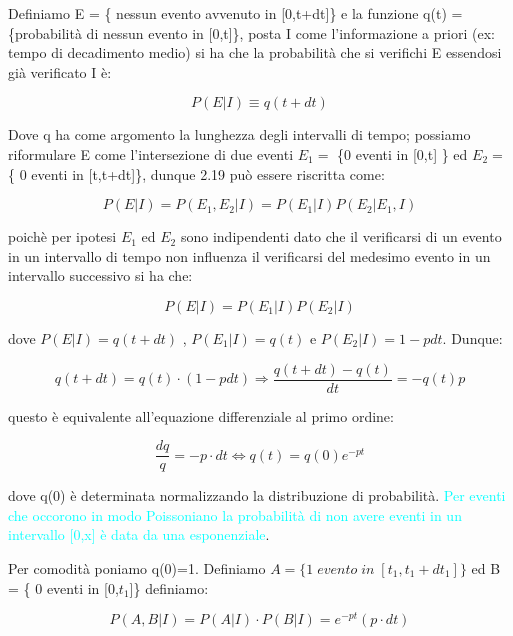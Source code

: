 \documentclass[11pt,a4paper]{book}
\begin{document}
Definiamo E = \{ nessun evento avvenuto in [0,t+dt]\} e la funzione q(t) = \{probabilit\`{a} di nessun evento in [0,t]\}, posta I come l'informazione a priori (ex: tempo di decadimento medio) si ha che la probabilit\`{a} che si verifichi E essendosi gi\`{a} verificato I \`{e}:

\begin{equation}
	P(E\vert I) \equiv q(t+dt)
\end{equation} 

Dove q ha come argomento la lunghezza degli intervalli di tempo; possiamo riformulare E come l'intersezione di due eventi $E_1 =$ \{0 eventi in [0,t] \} ed $E_2 = $ \{ 0 eventi in [t,t+dt]\}, dunque 2.19 pu\`{o} essere riscritta come:

\begin{equation*}
	P(E \vert I) = P(E_1,E_2 \vert I) = P(E_1 \vert I)P(E_2 \vert E_1 ,I)
\end{equation*}

poich\`{e} per ipotesi $E_{1}$ ed $E_{2}$ sono indipendenti dato che il verificarsi di un evento in un intervallo di tempo non influenza il verificarsi del medesimo evento in un intervallo successivo si ha che:

\begin{equation}
	P(E \vert I) = P(E_1 \vert I)P(E_2 \vert I)
\end{equation}

dove $P(E \vert I) = q(t+dt)$ , $P(E_1 \vert I) = q(t)$ e $P(E_2 \vert I) = 1-pdt$. Dunque:

\begin{equation}
	q(t+dt) = q(t)\cdot (1-pdt) \Rightarrow \dfrac{q(t+dt)-q(t)}{dt} = -q(t)p
\end{equation}

questo \`{e} equivalente all'equazione differenziale al primo ordine:

\begin{equation*}
	\dfrac{dq}{q} = -p \cdot dt \iff q(t) = q(0)e^{-pt}
\end{equation*}

dove q(0) \`{e} determinata normalizzando la distribuzione di probabilit\`{a}. \textcolor{cyan}{Per eventi che occorono in modo Poissoniano la probabilit\`{a} di non avere eventi in un intervallo [0,x] \`{e} data da una esponenziale}.

Per comodit\`{a} poniamo q(0)=1. Definiamo $A = \{ 1 \; evento \; in \; [t_1,t_1+dt_1] \}$ ed B = \{ 0 eventi in [0,$t_1$]\} definiamo:

\begin{equation}
	P(A,B \vert I) = P(A \vert I) \cdot P(B \vert I) = e^{-pt}(p \cdot dt)
\end{equation} 
\end{document}
